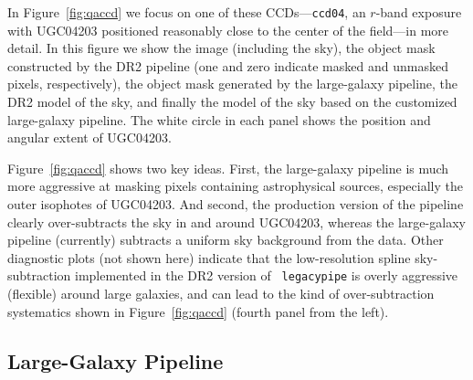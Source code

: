 In Figure~\ref{fig:qaccd} we focus on one of these CCDs---{\tt ccd04}, an
$r$-band exposure with UGC04203 positioned reasonably close to the center of the
field---in more detail.  In this figure we show the image (including the
sky), the object mask constructed by the DR2 pipeline (one and zero indicate
masked and unmasked pixels, respectively), the object mask generated by the
large-galaxy pipeline, the DR2 model of the sky, and finally the model of the
sky based on the customized large-galaxy pipeline.  The white circle in each
panel shows the position and angular extent of UGC04203.

Figure~\ref{fig:qaccd} shows two key ideas.  First, the large-galaxy pipeline is
much more aggressive at masking pixels containing astrophysical sources,
especially the outer isophotes of UGC04203.  And second, the production version
of the pipeline clearly over-subtracts the sky in and around UGC04203, whereas
the large-galaxy pipeline (currently) subtracts a uniform sky background from
the data.  Other diagnostic plots (not shown here) indicate that the
low-resolution spline sky-subtraction implemented in the DR2 version of {\tt
  legacypipe} is overly aggressive (flexible) around large galaxies, and can
lead to the kind of over-subtraction systematics shown in Figure~\ref{fig:qaccd}
(fourth panel from the left).




\subsection{Large-Galaxy Pipeline}\label{sec:largepipeline}

